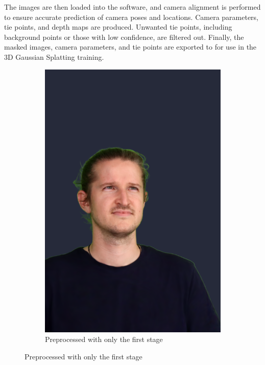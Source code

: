 The images are then loaded into the software, and camera alignment is performed to ensure accurate prediction of camera poses and locations. Camera parameters, tie points, and depth maps are produced. Unwanted tie points, including background points or those with low confidence, are filtered out. Finally, the masked images, camera parameters, and tie points are exported to for use in the 3D Gaussian Splatting training.


\begin{figure}[h]
	\centering

	\begin{subfigure}{0.4\linewidth}
		\includegraphics[width=\textwidth]{Figures/processed/1stage_ex.png}
		\caption{Preprocessed with only the first stage}
	\end{subfigure}

\end{figure}

